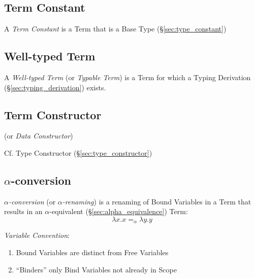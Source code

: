\subsection{Term Constant}\label{sec:term_constant}

A \emph{Term Constant} is a Term that is a Base Type
(\S\ref{sec:type_constant})



\subsection{Well-typed Term}\label{sec:well_typed}

A \emph{Well-typed Term} (or \emph{Typable Term}) is a Term for which
a Typing Derivation (\S\ref{sec:typing_derivation}) exists.



\subsection{Term Constructor}\label{sec:term_constructor}

(or \emph{Data Constructor})

\fist Cf. Type Constructor (\S\ref{sec:type_constructor})



\subsection{$\alpha$-conversion}\label{sec:alpha_conversion}

\emph{$\alpha$-conversion} (or \emph{$\alpha$-renaming}) is a renaming
of Bound Variables in a Term that results in an $\alpha$-equivalent
(\S\ref{sec:alpha_equivalence}) Term:
\[
  \lambda x.x =_\alpha \lambda y.y
\]

\emph{Variable Convention}:
\begin{enumerate}
  \item Bound Variables are distinct from Free Variables
  \item ``Binders'' only Bind Variables not already in Scope %
\end{enumerate}

